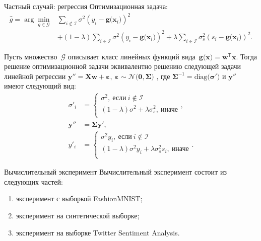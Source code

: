 \documentclass[9pt,pdf,hyperref={unicode}]{beamer}
\begin{document}
\begin{frame}{Частный случай: регрессия}
\justifying
Оптимизационная задача:
\[
\begin{aligned}
\hat{g} = \arg\min_{g\in \mathcal{G}} & \sum_{i\not\in \mathcal{I}}\sigma^2\left(y_i-\mathbf{g}\bigr(\mathbf{x}_i\bigr)\right)^2 \\
&+ \left(1-\lambda\right)\sum_{i\in \mathcal{I}}\sigma^2\left(y_i-\mathbf{g}\bigr(\mathbf{x}_i\bigr)\right)^2 + \lambda\sum_{i\in \mathcal{I}}\sigma_s^2\left(s_i-\mathbf{g}\bigr(\mathbf{x}_i\bigr)\right)^2.
\end{aligned}
\]

\begin{theorem}[Грабовой 2020]
\label{theorem:st:reg}
Пусть множество~$\mathcal{G}$ описывает класс линейных функций вида~$\mathbf{g}\bigr(\mathbf{x}\bigr) = \mathbf{w}^{\mathsf{T}}\mathbf{x}.$ Тогда решение оптимизационной задачи эквивалентно решению следующей задачи линейной регрессии $\mathbf{y''} = \mathbf{X}\mathbf{w} + \bm{\varepsilon},~\bm{\varepsilon} \sim \mathcal{N}\bigr(\mathbf{0}, \bm{\Sigma}\bigr)$ ,
где $\bm{\Sigma}^{-1}=\text{diag}\bigr(\bm{\sigma'}\bigr)$ и $\mathbf{y''}$ имеют следующий вид:
\[
\begin{aligned}
\sigma'_{i} &= \begin{cases}
\sigma^2,~\text{если}~i \not \in \mathcal{I}\\
\left(1-\lambda\right)\sigma^2+\lambda\sigma_s^2,~\text{иначе}\\
\end{cases}, \\
\mathbf{y''} &= \bm{\Sigma}\mathbf{y'},\\
y'_i &= \begin{cases}
\sigma^2y_i,~\text{если}~i \not \in \mathcal{I}\\
\left(1-\lambda\right)\sigma^2y_i+\lambda\sigma_s^2s_i,~\text{иначе}\\
\end{cases}.
\end{aligned}
\]
\end{theorem}
\end{frame}

\begin{frame}{Вычислительный эксперимент}
\justifying
Вычислительный эксперимент состоит из следующих частей:
\begin{enumerate}
	\item эксперимент с выборкой FashionMNIST;
	\item эксперимент на синтетической выборке;
	\item эксперимент на выборке Twitter Sentiment Analysis.
\end{enumerate}
\end{frame}
\end{document}
